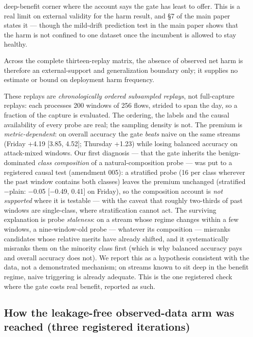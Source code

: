 \documentclass[a4paper,11pt]{article}
\makeatletter
\let\supp@subsection\subsection
\renewcommand{\subsection}{\FloatBarrier\supp@subsection}
\makeatother
\begin{document}
deep-benefit corner where the account says the gate has least to offer. This is a real limit on external validity for the harm result, and \S7 of the main paper states it --- though the mild-drift prediction test in the main paper shows that the harm is not confined to one dataset once the incumbent is allowed to stay healthy.



Across the complete thirteen-replay matrix, the absence of observed net harm is therefore an external-support and generalization boundary only; it supplies no estimate or bound on deployment harm frequency.

These replays are \emph{chronologically ordered subsampled replays}, not full-capture replays: each processes 200 windows of 256 flows, strided to span the day, so a fraction of the capture is evaluated. The ordering, the labels and the causal availability of every probe are real; the sampling density is not. The premium is \emph{metric-dependent}: on overall accuracy the gate \emph{beats} naive on the same streams (Friday +4.19 [3.85, 4.52]; Thursday +1.23) while losing balanced accuracy on attack-mixed windows. Our first diagnosis --- that the gate inherits the benign-dominated \emph{class composition} of a natural-composition probe --- was put to a registered causal test (amendment 005): a stratified probe (16 per class wherever the past window contains both classes) leaves the premium unchanged (stratified$-$plain: $-$0.05 [$-$0.49, 0.41] on Friday), so the composition account is \emph{not supported} where it is testable --- with the caveat that roughly two-thirds of past windows are single-class, where stratification cannot act. The surviving explanation is probe \emph{staleness}: on a stream whose regime changes within a few windows, a nine-window-old probe --- whatever its composition --- misranks candidates whose relative merits have already shifted, and it systematically misranks them on the minority class first (which is why balanced accuracy pays and overall accuracy does not). We report this as a hypothesis consistent with the data, not a demonstrated mechanism; on streams known to sit deep in the benefit regime, naive triggering is already adequate. This is the one registered check where the gate costs real benefit, reported as such.

\subsection{How the leakage-free observed-data arm was reached (three registered iterations)}
\end{document}
